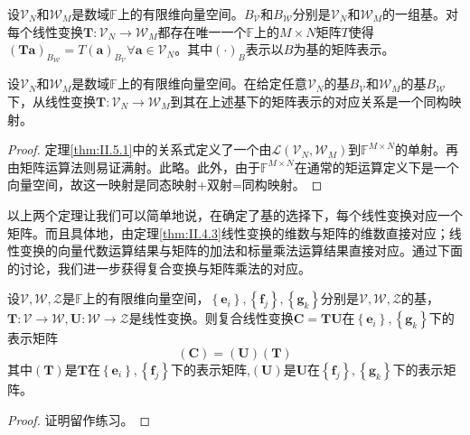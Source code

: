 \documentclass[main.tex]{subfiles}
\begin{document}
\begin{theorem}\label{thm:II.5.1}
设$\mathcal{V}_N$和$\mathcal{W}_M$是数域$\mathbb{F}$上的有限维向量空间。$B_\mathcal{V}$和$B_\mathcal{W}$分别是$\mathcal{V}_N$和$\mathcal{W}_M$的一组基。对每个线性变换$\mathbf{T}:\mathcal{V}_N\rightarrow\mathcal{W}_M$都存在唯一一个$\mathbb{F}$上的$M\times N$矩阵$T$使得$\left(\mathbf{Ta}\right)_{B_\mathcal{W}}=T\left(\mathbf{a}\right)_{B_\mathcal{V}}\forall\mathbf{a}\in\mathcal{V}_N$。其中$\left(\cdot\right)_B$表示以$B$为基的矩阵表示。
\end{theorem}

\begin{theorem}
设$\mathcal{V}_N$和$\mathcal{W}_M$是数域$\mathbb{F}$上的有限维向量空间。在给定任意$\mathcal{V}_N$的基$B_\mathcal{V}$和$\mathcal{W}_M$的基$B_\mathcal{W}$下，从线性变换$\mathbf{T}:\mathcal{V}_N\rightarrow\mathcal{W}_M$到其在上述基下的矩阵表示的对应关系是一个同构映射。
\end{theorem}
\begin{proof}
定理\ref{thm:II.5.1}中的关系式定义了一个由$\mathcal{L}\left(\mathcal{V}_N,\mathcal{W}_M\right)$到$\mathbb{F}^{M\times N}$的单射。再由矩阵运算法则易证满射。此略。此外，由于$\mathbb{F}^{M\times N}$在通常的矩运算定义下是一个向量空间，故这一映射是同态映射+双射=同构映射。
\end{proof}

以上两个定理让我们可以简单地说，在确定了基的选择下，每个线性变换对应一个矩阵。而且具体地，由定理\ref{thm:II.4.3}线性变换的维数与矩阵的维数直接对应；线性变换的向量代数运算结果与矩阵的加法和标量乘法运算结果直接对应。通过下面的讨论，我们进一步获得复合变换与矩阵乘法的对应。

\begin{theorem}\label{thm:II.5.3}
设$\mathcal{V},\mathcal{W},\mathcal{Z}$是$\mathbb{F}$上的有限维向量空间，$\left\{\mathbf{e}_i\right\},\left\{\mathbf{f}_j\right\},\left\{\mathbf{g}_k\right\}$分别是$\mathcal{V},\mathcal{W},\mathcal{Z}$的基，$\mathbf{T}:\mathcal{V}\rightarrow\mathcal{W},\mathbf{U}:\mathcal{W}\rightarrow\mathcal{Z}$是线性变换。则复合线性变换$\mathbf{C}=\mathbf{TU}$在$\left\{\mathbf{e}_i\right\},\left\{\mathbf{g}_k\right\}$下的表示矩阵
\[\left(\mathbf{C}\right)=\left(\mathbf{U}\right)\left(\mathbf{T}\right)\]
其中$\left(\mathbf{T}\right)$是$\mathbf{T}$在$\left\{\mathbf{e}_i\right\},\left\{\mathbf{f}_j\right\}$下的表示矩阵,$\left(\mathbf{U}\right)$是$\mathbf{U}$在$\left\{\mathbf{f}_j\right\},\left\{\mathbf{g}_k\right\}$下的表示矩阵。
\end{theorem}
\begin{proof}
证明留作练习。
\end{proof}
\end{document}
